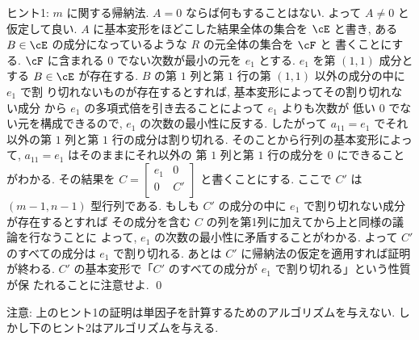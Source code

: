 \documentclass[12pt,twoside]{jarticle}
\begin{document}
\noindent
ヒント1: $m$ に関する帰納法.  $A=0$ ならば何もすることはない. 
よって $A\ne 0$ と仮定して良い.
$A$ に基本変形をほどこした結果全体の集合を $\cE$ と書き, 
ある $B\in\cE$ の成分になっているような $R$ の元全体の集合を $\cF$ と
書くことにする. $\cF$ に含まれる $0$ でない次数が最小の元を $e_1$ とする.
$e_1$ を第 $(1,1)$ 成分とする $B\in\cE$ が存在する. 
$B$ の第 $1$ 列と第 $1$ 行の第 $(1,1)$ 以外の成分の中に $e_1$ で割
り切れないものが存在するとすれば, 基本変形によってその割り切れない成分
から $e_1$ の多項式倍を引き去ることによって $e_1$ よりも次数が
低い $0$ でない元を構成できるので, $e_1$ の次数の最小性に反する.
したがって $a_{11}=e_1$ でそれ以外の第 $1$ 列と第 $1$ 行の成分は割り切れる.
そのことから行列の基本変形によって, $a_{11}=e_1$ はそのままにそれ以外の
第 $1$ 列と第 $1$ 行の成分を $0$ にできることがわかる.
その結果を $ C =
\begin{bmatrix}
  e_1 & 0 \\
  0   & C' \\
\end{bmatrix}$ と書くことにする. ここで $C'$ は $(m-1,n-1)$ 型行列である.
もしも $C'$ の成分の中に $e_1$ で割り切れない成分が存在するとすれば
その成分を含む $C$ の列を第1列に加えてから上と同様の議論を行なうことに
よって, $e_1$ の次数の最小性に矛盾することがわかる.
よって $C'$ のすべての成分は $e_1$ で割り切れる.
あとは $C'$ に帰納法の仮定を適用すれば証明が終わる.
$C'$ の基本変形で「$C'$ のすべての成分が $e_1$ で割り切れる」という性質が保
たれることに注意せよ.
\qed

\medskip
\noindent
注意: 上のヒント1の証明は単因子を計算するためのアルゴリズムを与えない.
しかし下のヒント2はアルゴリズムを与える.
\end{document}
